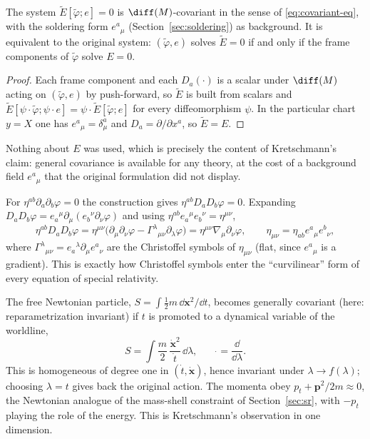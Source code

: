 \begin{proposition}[Kretschmann]\label{prop:kretschmann}
The system $\tilde E[\tilde\varphi;e]=0$ is $\diff(M)$-covariant in the sense
of \eqref{eq:covariant-eq}, with the soldering form $e^a{}_\mu$ (Section~\ref{sec:soldering}) as background.
It is equivalent to the original system: $(\tilde\varphi,e)$ solves
$\tilde E=0$ if and only if the frame components of $\tilde\varphi$ solve
$E=0$.
\end{proposition}
\begin{proof}
Each frame component and each $D_a(\cdot)$ is a scalar under $\diff(M)$ acting
on $(\tilde\varphi,e)$ by push-forward, so $\tilde E$ is built from scalars
and $\tilde E[\psi\!\cdot\!\tilde\varphi;\psi\!\cdot\! e]
=\psi\!\cdot\!\tilde E[\tilde\varphi;e]$ for every diffeomorphism $\psi$. In the
particular chart $y=X$ one has $e^a{}_\mu=\delta^a_\mu$ and $D_a=\partial/\partial x^a$,
so $\tilde E=E$. \qedhere
\end{proof}

Nothing about $E$ was used, which is precisely the content of Kretschmann's
claim: general covariance is available for any theory, at the cost of a
background field $e^a{}_\mu$ that the original formulation did not display.

\begin{example}\label{ex:wave}
For $\eta^{ab}\partial_a\partial_b\varphi=0$ the construction gives
$\eta^{ab}D_aD_b\varphi=0$. Expanding $D_aD_b\varphi=e_a{}^\mu\partial_\mu(e_b{}^\nu\partial_\nu\varphi)$
and using $\eta^{ab}e_a{}^\mu e_b{}^\nu=\eta^{\mu\nu}$,
\begin{equation}
  \eta^{ab}D_aD_b\varphi
  =\eta^{\mu\nu}\big(\partial_\mu\partial_\nu\varphi-\Gamma^\lambda{}_{\mu\nu}\partial_\lambda\varphi\big)
  =\eta^{\mu\nu}\nabla_\mu\partial_\nu\varphi,\qquad
  \eta_{\mu\nu}=\eta_{ab}e^a{}_\mu e^b{}_\nu,
\end{equation}
where $\Gamma^\lambda{}_{\mu\nu}=e_a{}^\lambda\partial_\mu e^a{}_\nu$ are the
Christoffel symbols of $\eta_{\mu\nu}$ (flat, since $e^a{}_\mu$ is a gradient). This is exactly
how Christoffel symbols enter the ``curvilinear'' form of every equation of
special relativity.
\end{example}

\begin{example}\label{ex:param}
The free Newtonian particle, $S=\int\tfrac12m\,\dd{\bm{x}}^2/\dd t$, becomes
generally covariant (here: reparametrization invariant) if $t$ is promoted to a
dynamical variable of the worldline,
\begin{equation}
  S=\int\frac m2\,\frac{\dot{{\bm{x}}}^2}{\dot t}\,\dd\lambda,\qquad
  \dot{}=\frac{\dd}{\dd\lambda}.
\end{equation}
This is homogeneous of degree one in $(\dot t,\dot{\bm{x}})$, hence invariant under
$\lambda\to f(\lambda)$; choosing $\lambda=t$ gives back the original
action. The momenta obey $p_t+{\bm{p}}^2/2m\approx0$, the Newtonian analogue of the
mass-shell constraint of Section~\ref{sec:sr}, with $-p_t$ playing the
role of the energy. This is Kretschmann's observation in one dimension.
\end{example}

